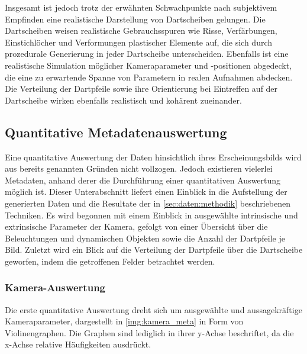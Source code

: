 Insgesamt ist jedoch trotz der erwähnten Schwachpunkte nach subjektivem Empfinden eine realistische Darstellung von Dartscheiben gelungen. Die Dartscheiben weisen realistische Gebrauchsspuren wie Risse, Verfärbungen, Einstichlöcher und Verformungen plastischer Elemente auf, die sich durch prozedurale Generierung in jeder Dartscheibe unterscheiden. Ebenfalls ist eine realistische Simulation möglicher Kameraparameter und -positionen abgedeckt, die eine zu erwartende Spanne von Parametern in realen Aufnahmen abdecken. Die Verteilung der Dartpfeile sowie ihre Orientierung bei Eintreffen auf der Dartscheibe wirken ebenfalls realistisch und kohärent zueinander.


\subsection{Quantitative Metadatenauswertung} %
\label{sec:metadaten}

Eine quantitative Auswertung der Daten hinsichtlich ihres Erscheinungsbilds wird aus bereits genannten Gründen nicht vollzogen. Jedoch existieren vielerlei Metadaten, anhand derer die Durchführung einer quantitativen Auswertung möglich ist. Dieser Unterabschnitt liefert einen Einblick in die Aufstellung der generierten Daten und die Resultate der in \autoref{sec:daten:methodik} beschriebenen Techniken. Es wird begonnen mit einem Einblick in ausgewählte intrinsische und extrinsische Parameter der Kamera, gefolgt von einer Übersicht über die Beleuchtungen und dynamischen Objekten sowie die Anzahl der Dartpfeile je Bild. Zuletzt wird ein Blick auf die Verteilung der Dartpfeile über die Dartscheibe geworfen, indem die getroffenen Felder betrachtet werden.

\subsubsection{Kamera-Auswertung}
\label{sec:kamera_ergebnisse}

Die erste quantitative Auswertung dreht sich um ausgewählte und aussagekräftige Kameraparameter, dargestellt in \autoref{img:kamera_meta} in Form von Violinengraphen. Die Graphen sind lediglich in ihrer y-Achse beschriftet, da die x-Achse relative Häufigkeiten ausdrückt.

